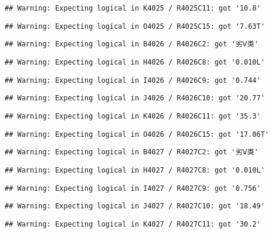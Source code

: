 \documentclass[
]{article}
\begin{document}
\begin{verbatim}
## Warning: Expecting logical in K4025 / R4025C11: got '10.8'
\end{verbatim}

\begin{verbatim}
## Warning: Expecting logical in O4025 / R4025C15: got '7.63T'
\end{verbatim}

\begin{verbatim}
## Warning: Expecting logical in B4026 / R4026C2: got '劣Ⅴ类'
\end{verbatim}

\begin{verbatim}
## Warning: Expecting logical in H4026 / R4026C8: got '0.010L'
\end{verbatim}

\begin{verbatim}
## Warning: Expecting logical in I4026 / R4026C9: got '0.744'
\end{verbatim}

\begin{verbatim}
## Warning: Expecting logical in J4026 / R4026C10: got '20.77'
\end{verbatim}

\begin{verbatim}
## Warning: Expecting logical in K4026 / R4026C11: got '35.3'
\end{verbatim}

\begin{verbatim}
## Warning: Expecting logical in O4026 / R4026C15: got '17.06T'
\end{verbatim}

\begin{verbatim}
## Warning: Expecting logical in B4027 / R4027C2: got '劣Ⅴ类'
\end{verbatim}

\begin{verbatim}
## Warning: Expecting logical in H4027 / R4027C8: got '0.010L'
\end{verbatim}

\begin{verbatim}
## Warning: Expecting logical in I4027 / R4027C9: got '0.756'
\end{verbatim}

\begin{verbatim}
## Warning: Expecting logical in J4027 / R4027C10: got '18.49'
\end{verbatim}

\begin{verbatim}
## Warning: Expecting logical in K4027 / R4027C11: got '30.2'
\end{verbatim}
\end{document}
